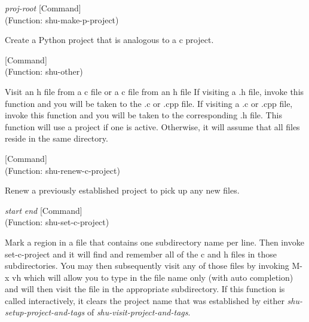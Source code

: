 \vspace{1em}
\noindent
{}
\usebox{\funcname}\emph{proj-root}
 \hfill [Command]\\%
 (Function: shu-make-p-project)

\begin{doc-string}
Create a Python project that is analogous to a c project.
\end{doc-string}

\vspace{1em}
\noindent
{}
\usebox{\funcname}
 \hfill [Command]\\%
 (Function: shu-other)

\begin{doc-string}
Visit an h file from a c file or a c file from an h file If visiting a .h
file, invoke this function and you will be taken to the .c or .cpp file.  If
visiting a .c or .cpp file, invoke this function and you will be taken to the
corresponding .h file.  This function will use a project if one is active.
Otherwise, it will assume that all files reside in the same directory.
\end{doc-string}

\vspace{1em}
\noindent
{}
\usebox{\funcname}
 \hfill [Command]\\%
 (Function: shu-renew-c-project)

\begin{doc-string}
Renew a previously established project to pick up any new files.
\end{doc-string}

\vspace{1em}
\noindent
{}
\usebox{\funcname}\emph{start} \emph{end}
 \hfill [Command]\\%
 (Function: shu-set-c-project)

\begin{doc-string}
Mark a region in a file that contains one subdirectory name per line.  Then
invoke set-c-project and it will find and remember all of the c and h files in
those subdirectories.  You may then subsequently visit any of those files by
invoking M-x vh which will allow you to type in the file name only (with auto
completion) and will then visit the file in the appropriate subdirectory.  If
this function is called interactively, it clears the project name that was
established by either \emph{shu-setup-project-and-tags} of \emph{shu-visit-project-and-tags}.
\end{doc-string}

